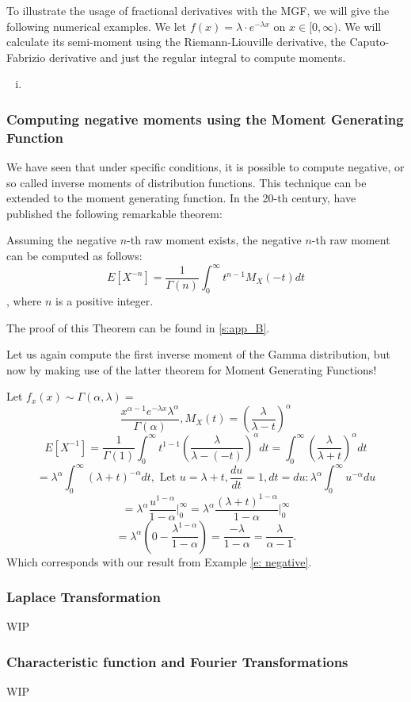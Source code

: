 To illustrate the usage of fractional derivatives with the MGF, we will give the following numerical examples. We let \(f(x) = \lambda \cdot e^{-\lambda x}\) on \(x \in [0, \infty)\). We will calculate its semi-moment using the Riemann-Liouville derivative, the Caputo-Fabrizio derivative and just the regular integral to compute moments.

\begin{example}
    \begin{enumerate}[(i)]
        \item 
    \end{enumerate}
\end{example}

\subsubsection{Computing negative moments using the Moment Generating Function}
We have seen that under specific conditions, it is possible to compute negative, or so called inverse moments of distribution functions. This technique can be extended to the moment generating function. In the 20-th century, \cite{cressie1981} have published the following remarkable theorem:

\begin{theorem}\label{t: negative}
    Assuming the negative \(n\)-th raw moment exists, the negative \(n\)-th raw moment can be computed as follows: 
    \[E[X^{-n}] = \frac{1}{\Gamma(n)} \int_{0}^{\infty} t^{n- 1} M_X(-t) dt\], where \(n\) is a positive integer.
\end{theorem}
The proof of this Theorem can be found in \ref{s:app_B}.

Let us again compute the first inverse moment of the Gamma distribution, but now by making use of the latter theorem for Moment Generating Functions!

\begin{example}
    Let \(f_x(x) \sim \Gamma(\alpha, \lambda) =\) 
    \[\frac{x^{\alpha -1} e^{-\lambda x} \lambda^\alpha} {\Gamma(\alpha)}, M_X(t) = (\frac{\lambda}{\lambda - t})^\alpha\]
    \[E[X^{-1}] = \frac{1}{\Gamma(1)} \int_{0}^{\infty} t^{ 1 - 1} (\frac{\lambda}{\lambda - (-t)})^\alpha dt =  \int_{0}^{\infty} (\frac{\lambda}{\lambda + t})^\alpha dt\]
    \[ = \lambda^\alpha \int_{0}^{\infty} (\lambda + t)^{-\alpha} dt, \text{ Let } u = \lambda + t, \frac{du}{dt} = 1, dt = du: \lambda^\alpha \int_{0}^{\infty} u^{-\alpha} du\]
    \[ =  \lambda^\alpha \frac{u^{ 1-\alpha}}{1 -\alpha}\Big|_{0}^{\infty} = \lambda^\alpha \frac{(\lambda + t)^{1 -\alpha}}{1 -\alpha}\Big|_{0}^{\infty}\]
    \[= \lambda^\alpha( 0 - \frac{\lambda^{ 1 - \alpha}}{1 -\alpha}) = \frac{-\lambda}{ 1 - \alpha} = \frac{\lambda}{\alpha - 1}.\] Which corresponds with our result from Example \ref{e: negative}.
\end{example}

\subsubsection{Laplace Transformation}
WIP

\subsubsection{Characteristic function and Fourier Transformations}
WIP